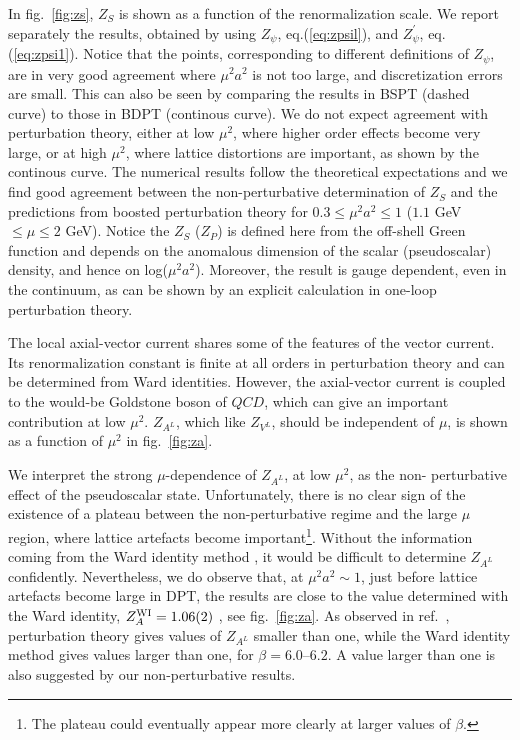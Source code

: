 In fig.\ \ref{fig:zs}, $Z_S$ is
shown as a function of the renormalization scale.
We report separately the results, obtained by using
$Z_\psi$, eq.(\ref{eq:zpsil}), and $Z^\prime_\psi$,  eq.(\ref{eq:zpsi1}).
Notice that
the points, corresponding to different definitions of $Z_\psi$, are in very
good agreement where $\mu^2 a^2$ is not too large, and
discretization errors
are small. This can also  be seen  by comparing the results in BSPT
(dashed curve) to those in BDPT (continous curve).
We do not expect agreement
with perturbation theory, either at low $\mu^2$, where higher order effects
become very large, or at high $\mu^2$, where lattice distortions are important,
as shown by the continous curve.
The numerical results follow the theoretical expectations and we find good
agreement between the non-perturbative determination of $Z_S$ and the
predictions
from boosted perturbation theory for $0.3 \le \mu^2 a^2 \le 1$
($1.1$ GeV $\le \mu \le 2$ GeV). Notice the $Z_S$ ($Z_P$) is defined here
from the off-shell Green function and depends on the anomalous dimension
 of the scalar (pseudoscalar) density,
and hence  on log($\mu^2 a^2$). Moreover,
the result is gauge dependent, even in the continuum,
 as can be shown by an explicit
calculation in one-loop perturbation theory.


The local axial-vector current shares some of the features of the vector
current.
Its renormalization constant is finite at all orders in perturbation theory
\cite{curci} and can be determined from  Ward identities. However, the
axial-vector current is coupled to the would-be Goldstone boson of $QCD$, which
can give an important contribution at low $\mu^2$.
$Z_{A^L}$, which like $Z_{V^L}$, should be independent of  $\mu$,
 is
shown as a function of $\mu^2$
in fig.\ \ref{fig:za}.

 We interpret the strong $\mu$-dependence of
$Z_{A^L}$, at low $\mu^2$, as the non-\-
per\-tur\-ba\-ti\-ve effect of the pseudoscalar state.
Unfortunately, there is no clear sign of the existence of a plateau between the
non-perturbative regime and the large $\mu$ region, where lattice artefacts
become important\footnote{The plateau could eventually appear more clearly at
larger values of $\beta$.}. Without the information coming
from the Ward identity method \cite{wi}, it would be difficult
to determine $Z_{A^L}$ confidently. Nevertheless,
we do observe that, at  $\mu^2 a^2 \sim 1$, just before lattice artefacts
become large in DPT,  the results are close to
the value determined
with the Ward identity, $Z^{{\rm WI}}_A= 1.06(2)$ \cite{wi,gribov}, see
fig.\ \ref{fig:za}.
As observed in ref.\ \cite{wi},  perturbation theory gives values of
$Z_{A^L}$ smaller than one, while the Ward identity method
gives values larger than one, for $\beta=6.0$--$6.2$. A value
larger than one is also suggested by our non-perturbative
results.

